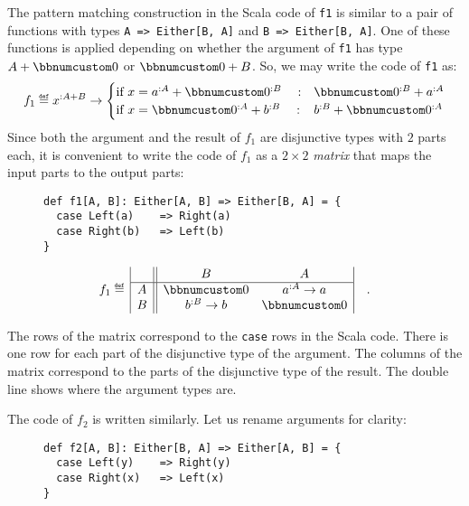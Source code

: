 The pattern matching construction in the Scala code of \lstinline!f1!
is similar to a pair of functions with types \lstinline!A => Either[B, A]!
and \lstinline!B => Either[B, A]!. One of these functions is applied
depending on whether the argument of \lstinline!f1! has type $A+\bbnum 0$
or $\bbnum 0+B$. So, we may write the code of \lstinline!f1! as:
\[
f_{1}\triangleq x^{:A+B}\rightarrow\begin{cases}
\text{if }x=a^{:A}+\bbnum 0^{:B}\quad: & \bbnum 0^{:B}+a^{:A}\\
\text{if }x=\bbnum 0^{:A}+b^{:B}\quad: & b^{:B}+\bbnum 0^{:A}
\end{cases}
\]
Since both the argument and the result of $f_{1}$ are disjunctive
types with $2$ parts each, it is convenient to write the code of
$f_{1}$ as a $2\times2$ \emph{matrix} that maps the input parts
to the output parts:\begin{wrapfigure}{l}{0.5\columnwidth}%
\vspace{-0.5\baselineskip}
\begin{lstlisting}
def f1[A, B]: Either[A, B] => Either[B, A] = {
  case Left(a)    => Right(a)
  case Right(b)   => Left(b)
}
\end{lstlisting}
\vspace{-2\baselineskip}
\end{wrapfigure}%
\vspace{-0.6\baselineskip}
\[
f_{1}\triangleq\,\begin{array}{|c||cc|}
 & B & A\\
\hline A & \bbnum 0 & a^{:A}\rightarrow a\\
B & b^{:B}\rightarrow b & \bbnum 0
\end{array}\quad.
\]
\vspace{-0.5\baselineskip}

The rows of the matrix correspond to the \lstinline!case! rows in
the Scala code. There is one row for each part of the disjunctive
type of the argument. The columns of the matrix correspond to the
parts of the disjunctive type of the result.
The double line shows where the argument types are.

The code of $f_{2}$ is written similarly. Let us rename arguments
for clarity:\hfill{}~\begin{wrapfigure}[4]{l}{0.5\columnwidth}%
\vspace{-0.7\baselineskip}
\begin{lstlisting}
def f2[A, B]: Either[B, A] => Either[A, B] = {
  case Left(y)    => Right(y)
  case Right(x)   => Left(x)
}
\end{lstlisting}
\vspace{-1.5\baselineskip}
\end{wrapfigure}%

